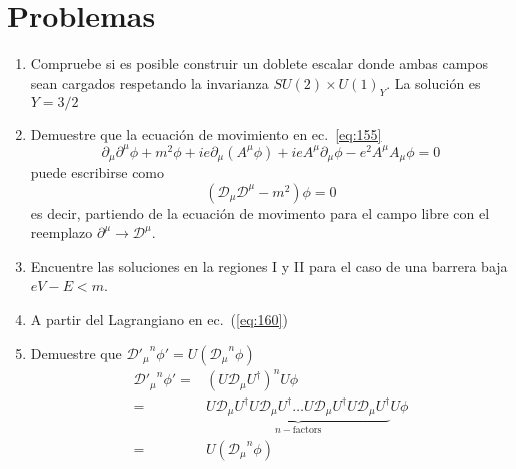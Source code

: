 \section{Problemas}
\label{sec:problemas-3}
\renewcommand{\labelenumi}{\thechapter.\theenumi} %
\begin{enumerate} %
\item Compruebe si es posible construir un doblete escalar donde ambas campos sean cargados respetando la invarianza $SU(2)\times U(1)_Y$. La soluci\'on es $Y=3/2$
\label{item:pch3.1} %
\item Demuestre que la ecuaci\'on de movimiento en ec.~\eqref{eq:155}
  \begin{equation*}
      \partial_\mu\partial^\mu\phi+m^2\phi+ie\partial_\mu (A^\mu\phi)+ieA^\mu\partial_\mu\phi-e^2A^\mu A_\mu\phi=0
  \end{equation*}
puede escribirse como
\begin{equation}
  (\mathcal{D}_\mu\mathcal{D}^\mu-m^2)\phi=0
\end{equation}
es decir, partiendo de la ecuaci\'on de movimento para el campo libre con el reemplazo $\partial^\mu\to \mathcal{D}^\mu$.
\label{item:pch3.1a} %
\item Encuentre las soluciones en la regiones I y II para el caso de una barrera baja $eV-E<m$.
\label{item:pch3.1cc}

\item A partir del Lagrangiano en ec.~(\ref{eq:160})
\label{item:pch3.1c}


\item Demuestre que ${{\mathcal{D}'}_\mu}^n\phi'=U({\mathcal{D}_\mu}^n\phi)$ 
  \begin{align}
    {{\mathcal{D}'}_\mu}^n\phi'=&(U{\mathcal{D}}_\mu U^\dagger)^n U\phi\nonumber\\
    =&\underbrace{U{\mathcal{D}}_\mu U^\dagger U{\mathcal{D}}_\mu U^\dagger\ldots U{\mathcal{D}}_\mu U^\dagger U{\mathcal{D}}_\mu U^\dagger}_{n-\text{factors}} U\phi\nonumber\\
    =&U({\mathcal{D}_\mu}^n\phi)
  \end{align}
\label{item:pch3.1d} %


\end{enumerate}
